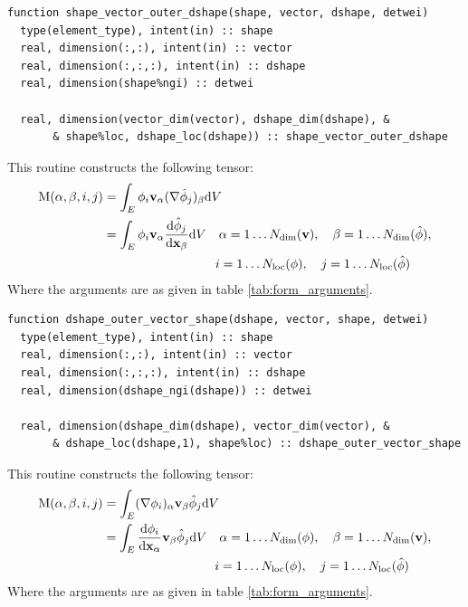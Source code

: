 \documentclass[a4paper, 11pt]{book}
\begin{document}

\begin{lstlisting}
function shape_vector_outer_dshape(shape, vector, dshape, detwei)
  type(element_type), intent(in) :: shape
  real, dimension(:,:), intent(in) :: vector
  real, dimension(:,:,:), intent(in) :: dshape
  real, dimension(shape%ngi) :: detwei

  real, dimension(vector_dim(vector), dshape_dim(dshape), &
       & shape%loc, dshape_loc(dshape)) :: shape_vector_outer_dshape
\end{lstlisting}

This routine constructs the following tensor:
\begin{equation}
\begin{split} 
  \mat{M}(\alpha,\beta,i,j)&=\int_E \phi_{i}\v_\alpha(\grad\hat{\phi}_{j})_\beta\d V\\
  &=\int_E \phi_{i}\v_\alpha\frac{\d\hat\phi_{j}}{\d\x_\beta}\d V
  \quad\alpha=1\ldots\Ndim(\v),\quad\beta=1\ldots\Ndim(\hat\phi),\\
  &\smash{\phantom{=\int_E \phi_{i}\v_\alpha\frac{\d\hat\phi_{j}}{\d\x_\beta}\d V}}
  \quad i=1\ldots\Nloc(\phi),\quad j=1\ldots\Nloc(\hat{\phi})
\end{split}
\end{equation}
Where the arguments are as given in table
\ref{tab:form_arguments}. 



\begin{lstlisting}
function dshape_outer_vector_shape(dshape, vector, shape, detwei)
  type(element_type), intent(in) :: shape
  real, dimension(:,:), intent(in) :: vector
  real, dimension(:,:,:), intent(in) :: dshape
  real, dimension(dshape_ngi(dshape)) :: detwei

  real, dimension(dshape_dim(dshape), vector_dim(vector), &
       & dshape_loc(dshape,1), shape%loc) :: dshape_outer_vector_shape
\end{lstlisting}

This routine constructs the following tensor:
\begin{equation}
\begin{split} 
  \mat{M}(\alpha,\beta,i,j)&=\int_E (\grad\phi_{i})_\alpha\v_\beta\hat{\phi}_{j}\d V\\
  &=\int_E \frac{\d\phi_{i}}{\d\x_\alpha}\v_\beta\hat\phi_{j}\d V
  \quad\alpha=1\ldots\Ndim(\phi),\quad\beta=1\ldots\Ndim(\v),\\
  &\smash{\phantom{=\int_E \phi_{i}\v_\alpha\frac{\d\hat\phi_{j}}{\d\x_\beta}\d V}}
  \quad i=1\ldots\Nloc(\phi),\quad j=1\ldots\Nloc(\hat{\phi})
\end{split}
\end{equation}
Where the arguments are as given in table
\ref{tab:form_arguments}. 
\end{document}
